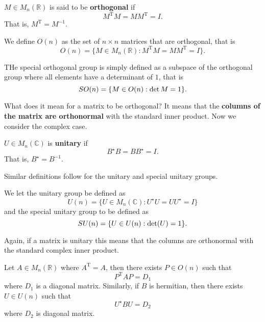 \begin{definition}
    $M \in M_n(\mathbb R)$ is said to be \textbf{orthogonal} if \[ M^{\mathrm T} M = M M^{\mathrm T} = I. \] That is, $M^{\mathrm T} = M^{-1}$.
\end{definition}

\begin{definition}
    We define $O(n)$ as the set of $n \times n$ matrices that are orthogonal, that is \[ O(n) = \{ M \in M_{n}(\mathbb R) : M^{\mathrm T} M = M M^{\mathrm T} = I \}. \]
\end{definition}

\begin{definition}
    THe special orthogonal group is simply defined as a subspace of the orthogonal group where all elements have a determinant of $1$, that is \[ SO(n) = \{ M \in O(n) : \operatorname{det}{M} = 1 \}. \]
\end{definition}

What does it mean for a matrix to be orthogonal? It means that the \textbf{columns of the matrix are orthonormal} with the standard inner product. Now we consider the complex case.

\begin{definition}
    $U \in M_n(\mathbb C)$ is \textbf{unitary} if \[ B^{\star} B = B B^{\star} = I. \] That is, $B^{\star} = B^{-1}$.
\end{definition}

Similar definitions follow for the unitary and special unitary groups.

\begin{definition}
    We let the unitary group be defined as \[ U(n) = \{ U \in M_n(\mathbb C) : U^{\star} U = U U^{\star} = I \} \] and the special unitary group to be defined as \[ SU(n) = \{ U \in U(n) : \operatorname{det}(U) = 1 \}. \]
\end{definition}

Again, if a matrix is unitary this means that the columns are orthonormal with the standard complex inner product.

\begin{proposition}
    Let $A \in M_n(\mathbb R)$ where $A^{\mathrm T} = A$, then there exists $P \in O(n)$ such that \[ P^{\mathrm T} A P = D_1 \] where $D_1$ is a diagonal matrix. Similarly, if $B$ is hermitian, then there exists $U \in U(n)$ such that \[ U^{\star} B U = D_2 \] where $D_2$ is diagonal matrix.
\end{proposition}

